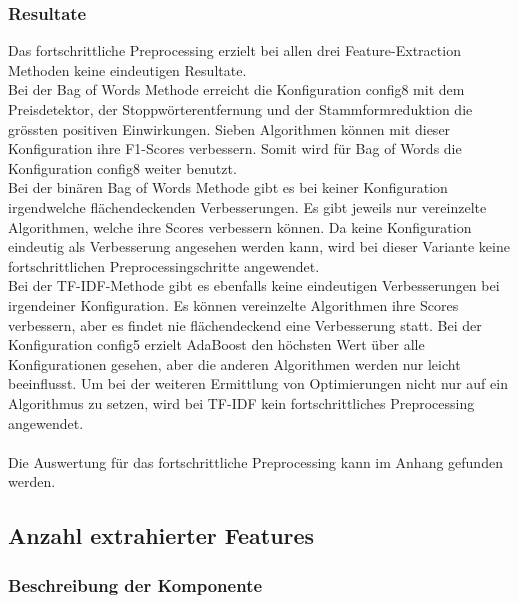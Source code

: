 \subsubsection{Resultate}
Das fortschrittliche Preprocessing erzielt bei allen drei Feature-Extraction Methoden keine eindeutigen Resultate.\\
Bei der \glqq Bag of Words\grqq{} Methode erreicht die Konfiguration \glqq config8\grqq{} mit dem Preisdetektor, der Stoppwörterentfernung und der Stammformreduktion die grössten positiven Einwirkungen.
Sieben Algorithmen können mit dieser Konfiguration ihre F1-Scores verbessern.
Somit wird für \glqq Bag of Words\grqq{} die Konfiguration \glqq config8\grqq{} weiter benutzt.\\
Bei der binären \glqq Bag of Words\grqq{} Methode gibt es bei keiner Konfiguration irgendwelche flächendeckenden Verbesserungen.
Es gibt jeweils nur vereinzelte Algorithmen, welche ihre Scores verbessern können.
Da keine Konfiguration eindeutig als Verbesserung angesehen werden kann, wird bei dieser Variante keine fortschrittlichen Preprocessingschritte angewendet.\\
Bei der TF-IDF-Methode gibt es ebenfalls keine eindeutigen Verbesserungen bei irgendeiner Konfiguration.
Es können vereinzelte Algorithmen ihre Scores verbessern, aber es findet nie flächendeckend eine Verbesserung statt.
Bei der Konfiguration \glqq config5\grqq{} erzielt AdaBoost den höchsten Wert über alle Konfigurationen gesehen, aber die anderen Algorithmen werden nur leicht beeinflusst.
Um bei der weiteren Ermittlung von Optimierungen nicht nur auf ein Algorithmus zu setzen, wird bei TF-IDF kein fortschrittliches Preprocessing angewendet.
\\\\
Die Auswertung für das fortschrittliche Preprocessing kann im Anhang gefunden werden.
\subsection{Anzahl extrahierter Features}
\subsubsection{Beschreibung der Komponente}
